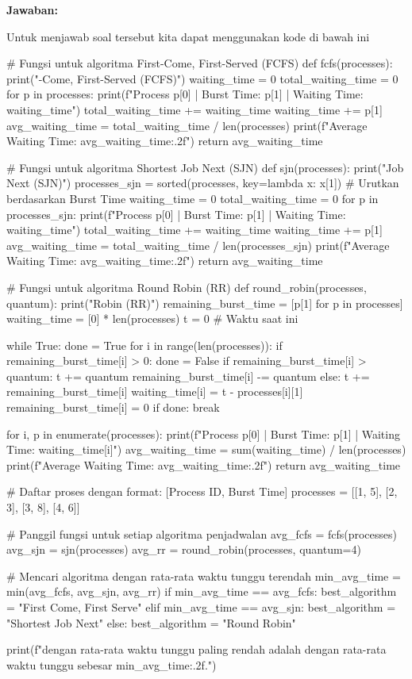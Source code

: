 \documentclass[12pt]{article}
\begin{document}
\noindent \textbf{Jawaban: }

\noindent Untuk menjawab soal tersebut kita dapat menggunakan kode di bawah ini
\begin{python}
# Fungsi untuk algoritma First-Come, First-Served (FCFS)
def fcfs(processes):
    print("\nFirst-Come, First-Served (FCFS)")
    waiting_time = 0
    total_waiting_time = 0
    for p in processes:
        print(f"Process {p[0]} | Burst Time: {p[1]} | Waiting Time: {waiting_time}")
        total_waiting_time += waiting_time
        waiting_time += p[1]
    avg_waiting_time = total_waiting_time / len(processes)
    print(f"Average Waiting Time: {avg_waiting_time:.2f}")
    return avg_waiting_time

# Fungsi untuk algoritma Shortest Job Next (SJN)
def sjn(processes):
    print("\nShortest Job Next (SJN)")
    processes_sjn = sorted(processes, key=lambda x: x[1])  # Urutkan berdasarkan Burst Time
    waiting_time = 0
    total_waiting_time = 0
    for p in processes_sjn:
        print(f"Process {p[0]} | Burst Time: {p[1]} | Waiting Time: {waiting_time}")
        total_waiting_time += waiting_time
        waiting_time += p[1]
    avg_waiting_time = total_waiting_time / len(processes_sjn)
    print(f"Average Waiting Time: {avg_waiting_time:.2f}")
    return avg_waiting_time

# Fungsi untuk algoritma Round Robin (RR)
def round_robin(processes, quantum):
    print("\nRound Robin (RR)")
    remaining_burst_time = [p[1] for p in processes]
    waiting_time = [0] * len(processes)
    t = 0  # Waktu saat ini

    while True:
        done = True
        for i in range(len(processes)):
            if remaining_burst_time[i] > 0:
                done = False
                if remaining_burst_time[i] > quantum:
                    t += quantum
                    remaining_burst_time[i] -= quantum
                else:
                    t += remaining_burst_time[i]
                    waiting_time[i] = t - processes[i][1]
                    remaining_burst_time[i] = 0
        if done:
            break

    for i, p in enumerate(processes):
        print(f"Process {p[0]} | Burst Time: {p[1]} | Waiting Time: {waiting_time[i]}")
    avg_waiting_time = sum(waiting_time) / len(processes)
    print(f"Average Waiting Time: {avg_waiting_time:.2f}")
    return avg_waiting_time

# Daftar proses dengan format: [Process ID, Burst Time]
processes = [[1, 5], [2, 3], [3, 8], [4, 6]]

# Panggil fungsi untuk setiap algoritma penjadwalan
avg_fcfs = fcfs(processes)
avg_sjn = sjn(processes)
avg_rr = round_robin(processes, quantum=4)

# Mencari algoritma dengan rata-rata waktu tunggu terendah
min_avg_time = min(avg_fcfs, avg_sjn, avg_rr)
if min_avg_time == avg_fcfs:
    best_algorithm = "First Come, First Serve"
elif min_avg_time == avg_sjn:
    best_algorithm = "Shortest Job Next"
else:
    best_algorithm = "Round Robin"

print(f"\nAlgoritma dengan rata-rata waktu tunggu paling rendah adalah  dengan rata-rata waktu tunggu sebesar {min_avg_time:.2f}.")
\end{python}
\end{document}
